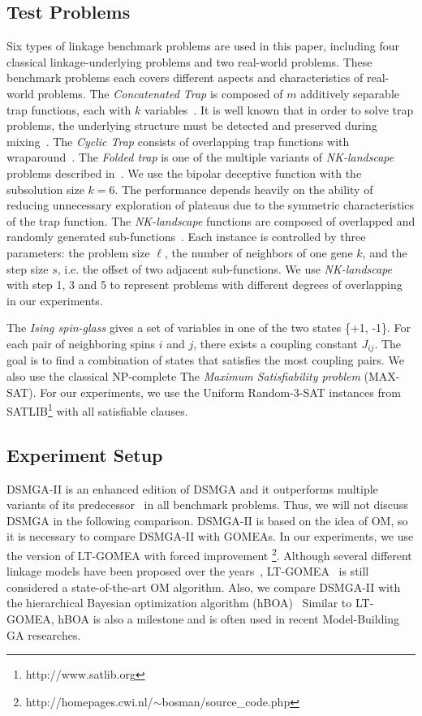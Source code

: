 \documentclass{sig-alternate-05-2015}
\begin{document}
\subsection{Test Problems}
Six types of linkage benchmark problems are used in this paper, including four classical linkage-underlying problems and two real-world problems. These benchmark problems each covers different aspects and characteristics of real-world problems. The \textit{Concatenated Trap} is composed of $m$ additively separable trap functions, each with $k$ variables~\cite{deb:sufficient}. It is well known that in order to solve trap problems, the underlying structure must be detected and preserved during mixing~\cite{thierens:mixing}. The \textit{Cyclic Trap} consists of overlapping trap functions with wraparound~\cite{yu:overlapping}. The \textit{Folded trap} is one of the multiple variants of \textit{NK-landscape} problems described in~\cite{goldberg:deception}. We use the bipolar deceptive function with the subsolution size $k = 6$. 
The performance depends heavily on the ability of reducing unnecessary exploration of plateaus due to the symmetric characteristics of the trap function. 
The \textit{NK-landscape} functions are composed of overlapped and randomly generated sub-functions~\cite{pelikan:overlap}. 
Each instance is controlled by three parameters: the problem size $\ell$, the number of neighbors of one gene $k$, and the step size $s$, i.e. the offset of two adjacent sub-functions.
We use \textit{NK-landscape} with step 1, 3 and 5 to represent problems with different degrees of overlapping in our experiments.

The \textit{Ising spin-glass} gives a set of variables in one of the two states \{+1, -1\}.
For each pair of neighboring spins $i$ and $j$, there exists a coupling constant $J_{ij}$.
The goal is to find a combination of states that satisfies the most coupling pairs.
We also use the classical NP-complete The \textit{Maximum Satisfiability problem} (MAX-SAT).
For our experiments, we use the Uniform Random-3-SAT instances from SATLIB\footnote{http://www.satlib.org} with all satisfiable clauses.



\subsection{Experiment Setup}
DSMGA-II is an enhanced edition of DSMGA and it outperforms multiple variants of its predecessor~\cite{yu:DSMGA} in all benchmark problems. 
Thus, we will not discuss DSMGA in the following comparison.
DSMGA-II is based on the idea of OM, so it is necessary to compare DSMGA-II with GOMEAs. 
In our experiments, we use the version of LT-GOMEA with forced improvement \footnote{http://homepages.cwi.nl/$\sim$bosman/source\_code.php}.
Although several different linkage models have been proposed over the years~\cite{bosman:robust}, LT-GOMEA~\cite{bosman:LT-GOMEA} is still considered a state-of-the-art OM algorithm.
Also, we compare DSMGA-II with the hierarchical Bayesian optimization algorithm (hBOA)~\cite{pelikan:hBOA}
Similar to LT-GOMEA, hBOA is also a milestone and is often used in recent Model-Building GA researches.
\end{document}
